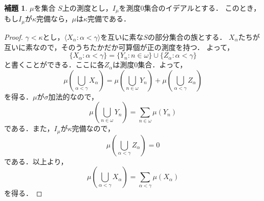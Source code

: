 \documentclass[uplatex]{jsarticle}
\newcommand{\seq}[1]{{\langle#1\rangle}}
\theoremstyle{definition}
\newtheorem{lem}[thm]{補題}
\begin{document}
	\begin{lem}
		$\mu$を集合 $S$上の測度とし，$I_\mu$を測度$0$集合のイデアルとする．
		このとき，もし$I_\mu$が$\kappa$完備なら，$\mu$は$\kappa$完備である．
	\end{lem}
	\begin{proof}
		$\gamma < \kappa$とし，$\seq{X_\alpha : \alpha < \gamma}$を互いに素な$S$の部分集合の族とする．
		$X_\alpha$たちが互いに素なので，そのうちたかだか可算個が正の測度を持つ．
		よって，
		\[
		\{ X_\alpha : \alpha < \gamma \} = \{ Y_n : n \in \omega \} \cup \{ Z_\alpha : \alpha < \gamma \}
		\]
		と書くことができる．ここに各$Z_\alpha$は測度$0$集合．よって，
		\[
		\mu(\bigcup_{\alpha < \gamma} X_\alpha) = \mu(\bigcup_{n \in \omega} Y_n) + \mu(\bigcup_{\alpha < \gamma} Z_\alpha)
		\]
		を得る．$\mu$が$\sigma$加法的なので，
		\[
		 \mu(\bigcup_{n \in \omega} Y_n) =  \sum_{n \in \omega} \mu(Y_n) 
		 \]
		 である．また，$I_\mu$が$\kappa$完備なので，
		 \[
		 \mu(\bigcup_{\alpha < \gamma} Z_\alpha) = 0
		 \]
		 である．以上より，
		 \[
		 \mu(\bigcup_{\alpha < \gamma} X_\alpha) = \sum_{\alpha < \gamma} \mu(X_\alpha)
		 \]
		 を得る．
	\end{proof}
\end{document}

